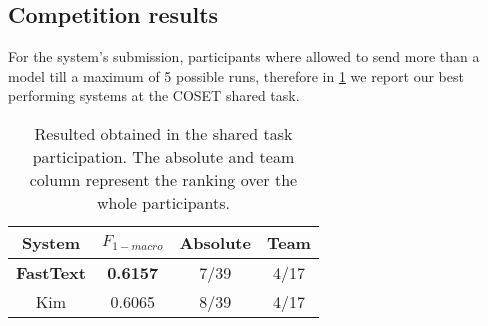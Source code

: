 \subsection{Competition results} \label{subsec:results}

For the system's submission, participants where allowed to send more than a model till a maximum of 5 possible runs, therefore in \cref{tab:results} we report our best performing systems at the COSET shared task.

\begin{table}[h]
	\footnotesize
	\caption{Resulted obtained in the shared task participation. The absolute and team column represent the ranking over the whole participants.}
	\label{tab:results}
	\centering
	\begin{tabular}{c|c|c|c}
		\toprule
		\hline
		System		& $F_{1-macro}$		& Absolute	& Team	\\
		\hline
		\textbf{FastText}	& \textbf{0.6157}	& 7/39	& 4/17 \\
		Kim			& 0.6065	& 8/39	& 4/17\\
		\hline
		\bottomrule
	\end{tabular}
\end{table}
